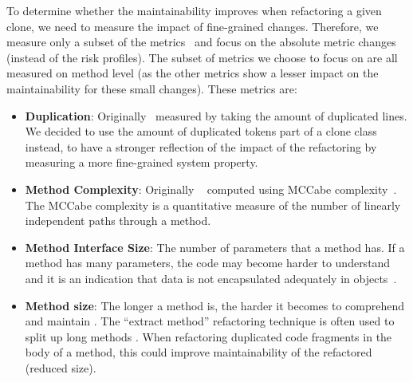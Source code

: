 \documentclass[sigconf,review,anonymous]{acmart}
\begin{document}
To determine whether the maintainability improves when refactoring a given clone, we need to measure the impact of fine-grained changes. Therefore, we measure only a subset of the metrics~\cite{heitlager2007practical} and focus on the absolute metric changes (instead of the risk profiles). The subset of metrics we choose to focus on are all measured on method level (as the other metrics show a lesser impact on the maintainability for these small changes). These metrics are:
\begin{itemize}
\item \textbf{Duplication}: Originally~\cite{heitlager2007practical} measured by taking the amount of duplicated lines. We decided to use the amount of duplicated tokens part of a clone class instead, to have a stronger reflection of the impact of the refactoring by measuring a more fine-grained system property.
\item \textbf{Method Complexity}:  Originally ~\cite{heitlager2007practical} computed using MCCabe complexity~\cite{mccabe1976complexity}. The MCCabe complexity is a quantitative measure of the number of linearly independent paths through a method.%
\item \textbf{Method Interface Size}: The number of parameters that a method has. If a method has many parameters, the code may become harder to understand and it is an indication that data is not encapsulated adequately in objects~\cite{fowler2018refactoring}.
\item \textbf{Method size}: The longer a method is, the harder it becomes to comprehend and maintain \cite{heitlager2007practical}. The ``extract method'' refactoring technique is often used to split up long methods \cite{charalampidou2018structural}. When refactoring duplicated code fragments in the body of a method, this could improve maintainability of the refactored (reduced size).
\end{itemize}
\end{document}
